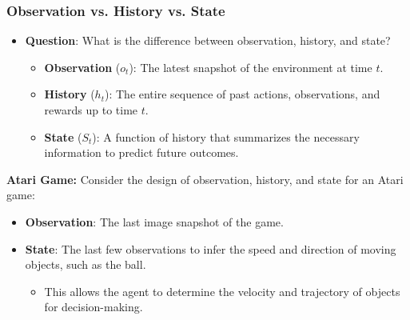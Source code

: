 \subsubsection{Observation vs. History vs. State}
\begin{definition}
    \begin{itemize}
        \item \textbf{Question}: What is the difference between observation, history, and state?
        \begin{itemize}
            \item \textbf{Observation} (\( o_t \)): The latest snapshot of the environment at time \( t \).
            \item \textbf{History} (\( h_t \)): The entire sequence of past actions, observations, and rewards up to time \( t \).
            \item \textbf{State} (\( S_t \)): A function of history that summarizes the necessary information to predict future outcomes.
        \end{itemize}
    \end{itemize}
\end{definition}

\begin{example}
    \textbf{Atari Game:} Consider the design of observation, history, and state for an Atari game:
    
    \begin{itemize}
        \item \textbf{Observation}: The last image snapshot of the game.
        \item \textbf{State}: The last few observations to infer the speed and direction of moving objects, such as the ball.
        \begin{itemize}
            \item This allows the agent to determine the velocity and trajectory of objects for decision-making.
        \end{itemize}
    \end{itemize}
\end{example}

